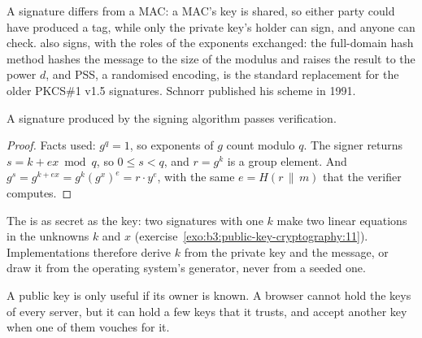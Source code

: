 A signature differs from a MAC: a MAC's key is shared, so either party could have produced a tag, while only the private key's holder can sign, and anyone can check.  also signs, with the roles of the exponents exchanged: the full-domain hash method hashes the message to the size of the modulus and raises the result to the power $d$, and PSS, a randomised encoding, is the standard replacement for the older PKCS\#1 v1.5 signatures. %
Schnorr published his scheme in 1991. %

\begin{theorem}\label{thm:b3:public-key-cryptography:schnorr}
A signature produced by the signing algorithm passes verification.
\end{theorem}

\begin{proof}
Facts used: $g^q = 1$, so exponents of $g$ count modulo $q$. The signer returns $s = k + ex \bmod q$, so $0 \le s < q$, and $r = g^k$ is a group element. And $g^s = g^{k + ex} = g^k (g^x)^e = r \cdot y^e$, with the same $e = H(r \,\|\, m)$ that the verifier computes.
\end{proof}

\label{lst:b3:public-key-cryptography:schnorr}

\label{out:b3:public-key-cryptography:schnorr}

The  is as secret as the key: two signatures with one $k$ make two linear equations in the unknowns $k$ and $x$ (exercise~\ref{exo:b3:public-key-cryptography:11}). %
Implementations therefore derive $k$ from the private key and the message, or draw it from the operating system's generator, never from a seeded one.

A public key is only useful if its owner is known. A browser cannot hold the keys of every server, but it can hold a few keys that it trusts, and accept another key when one of them vouches for it.

